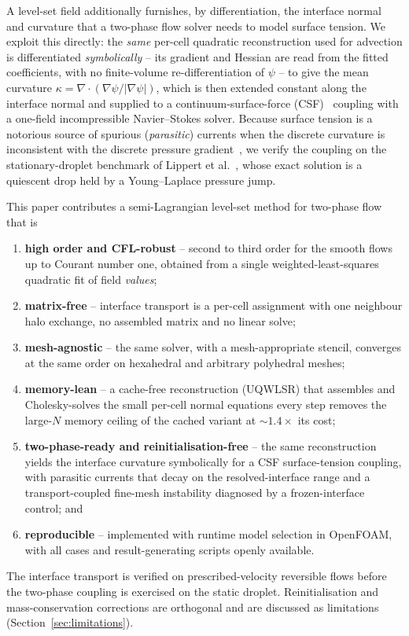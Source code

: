 \documentclass[preprint,3p,11pt]{elsarticle}
\newcommand{\psilev}{\psi}                       %
\begin{document}
A level-set field additionally furnishes, by differentiation, the interface normal and
curvature that a two-phase flow solver needs to model surface tension. We exploit this
directly: the \emph{same} per-cell quadratic reconstruction used for advection is
differentiated \emph{symbolically} -- its gradient and Hessian are read from the fitted
coefficients, with no finite-volume re-differentiation of $\psilev$ -- to give the mean
curvature $\kappa=\nabla\cdot(\nabla\psilev/\lvert\nabla\psilev\rvert)$, which is then
extended constant along the interface normal and supplied to a continuum-surface-force
(CSF)~\cite{brackbill1992} coupling with a one-field incompressible Navier--Stokes
solver. Because surface tension is a notorious source of spurious (\emph{parasitic})
currents when the discrete curvature is inconsistent with the discrete pressure
gradient~\cite{popinet2018}, we verify the coupling on the stationary-droplet benchmark
of Lippert et al.~\cite{lippert2022benchmark}, whose exact solution is a quiescent drop
held by a Young--Laplace pressure jump.

This paper contributes a semi-Lagrangian level-set method for two-phase flow that is
\begin{enumerate}\itemsep2pt
  \item \textbf{high order and CFL-robust} -- second to third order for the smooth
        flows up to Courant number one, obtained from a single weighted-least-squares
        quadratic fit of field \emph{values};
  \item \textbf{matrix-free} -- interface transport is a per-cell assignment with one
        neighbour halo exchange, no assembled matrix and no linear solve;
  \item \textbf{mesh-agnostic} -- the same solver, with a mesh-appropriate stencil,
        converges at the same order on hexahedral and arbitrary polyhedral meshes;
  \item \textbf{memory-lean} -- a cache-free reconstruction (UQWLSR) that assembles and
        Cholesky-solves the small per-cell normal equations every step removes the
        large-$N$ memory ceiling of the cached variant at $\sim\!1.4\times$ its cost;
  \item \textbf{two-phase-ready and reinitialisation-free} -- the same reconstruction
        yields the interface curvature symbolically for a CSF surface-tension coupling,
        with parasitic currents that decay on the resolved-interface range and a
        transport-coupled fine-mesh instability diagnosed by a frozen-interface control; and
  \item \textbf{reproducible} -- implemented with runtime model selection in OpenFOAM,
        with all cases and result-generating scripts openly available.
\end{enumerate}
The interface transport is verified on prescribed-velocity reversible flows before the
two-phase coupling is exercised on the static droplet. Reinitialisation and
mass-conservation corrections are orthogonal and are discussed as limitations
(Section~\ref{sec:limitations}).
\end{document}
